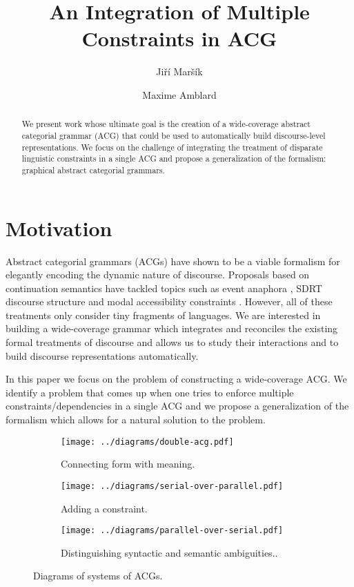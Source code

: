 \documentclass[twocolumn]{article}
\begin{document}
\title{An Integration of Multiple Constraints in ACG}
\author{Jiří Maršík \and Maxime Amblard}
\maketitle

\begin{abstract}
  We present work whose ultimate goal is the creation of a wide-coverage
  abstract categorial grammar (ACG) that could be used to automatically
  build discourse-level representations. We focus on the challenge of
  integrating the treatment of disparate linguistic constraints in a
  single ACG and propose a generalization of the formalism: graphical
  abstract categorial grammars.
\end{abstract}

\section{Motivation}

Abstract categorial grammars (ACGs) have shown to be a viable formalism
for elegantly encoding the dynamic nature of discourse. Proposals based
on continuation semantics \cite{de2006towards} have tackled topics such
as event anaphora \cite{qian2011event}, SDRT discourse structure
\cite{asher2011sdrt} and modal accessibility constraints
\cite{asher2011montagovian}. However, all of these treatments only
consider tiny fragments of languages. We are interested in building a
wide-coverage grammar which integrates and reconciles the existing
formal treatments of discourse and allows us to study their interactions
and to build discourse representations automatically.

In this paper we focus on the problem of constructing a wide-coverage
ACG. We identify a problem that comes up when one tries to enforce
multiple constraints/dependencies in a single ACG and we propose a
generalization of the formalism which allows for a natural solution to
the problem.


\begin{figure*}[t]
  \centering
  \begin{subfigure}[b]{0.25\textwidth}
    \centering
    \texttt{[image: ../diagrams/double-acg.pdf]}
    \caption{\label{fig:acg-comp-basic} Connecting form with meaning.}
  \end{subfigure}
  \qquad
  \begin{subfigure}[b]{0.25\textwidth}
    \centering
    \texttt{[image: ../diagrams/serial-over-parallel.pdf]}
    \caption{\label{fig:acg-comp-constr} Adding a constraint.}
  \end{subfigure}
  \qquad
  \begin{subfigure}[b]{0.25\textwidth}
    \centering
    \texttt{[image: ../diagrams/parallel-over-serial.pdf]}
    \caption{\label{fig:acg-comp-sem} Distinguishing syntactic and
      semantic ambiguities..}
  \end{subfigure}
  \caption{\label{fig:acg-comp} Diagrams of systems of ACGs.}
\end{figure*}
\end{document}
